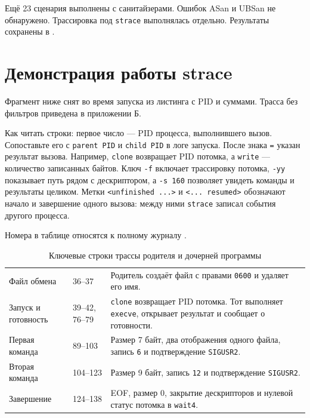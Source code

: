 \documentclass[12pt,a4paper]{article}
\begin{document}
Ещё 23 сценария выполнены с санитайзерами. Ошибок ASan и UBSan не обнаружено. Трассировка под \texttt{strace} выполнялась отдельно. Результаты сохранены в .

\section{Демонстрация работы strace}
Фрагмент ниже снят во время запуска из листинга с PID и суммами. Трасса без фильтров приведена в приложении Б.

Как читать строки: первое число --- PID процесса, выполнившего вызов. Сопоставьте его с \texttt{parent PID} и \texttt{child PID} в логе запуска. После знака \texttt{=} указан результат вызова. Например, \texttt{clone} возвращает PID потомка, а \texttt{write} --- количество записанных байтов. Ключ \texttt{-f} включает трассировку потомка, \texttt{-yy} показывает путь рядом с дескриптором, а \texttt{-s 160} позволяет увидеть команды и результаты целиком. Метки \texttt{<unfinished ...>} и \texttt{<... resumed>} обозначают начало и завершение одного вызова: между ними \texttt{strace} записал события другого процесса.

Номера в таблице относятся к полному журналу .

\begin{table}[H]
\small
\caption{Ключевые строки трассы родителя и дочерней программы}
\begin{tabularx}{\linewidth}{|P{3.6cm}|P{2cm}|L|}
\hline
{} &  &  \\ \hline
Файл обмена & 36--37 & Родитель создаёт файл с правами \texttt{0600} и удаляет его имя. \\ \hline
Запуск и готовность & 39--42, 76--79 & \texttt{clone} возвращает PID потомка. Тот выполняет \texttt{execve}, открывает результат и сообщает о готовности. \\ \hline
Первая команда & 89--103 & Размер 7 байт, два отображения одного файла, запись \texttt{6} и подтверждение \texttt{SIGUSR2}. \\ \hline
Вторая команда & 104--123 & Размер 9 байт, запись \texttt{12} и подтверждение \texttt{SIGUSR2}. \\ \hline
Завершение & 124--138 & EOF, размер 0, закрытие дескрипторов и нулевой статус потомка в \texttt{wait4}. \\ \hline
\end{tabularx}
\end{table}
\end{document}
